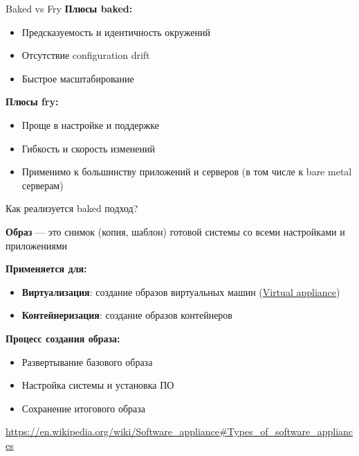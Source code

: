 \documentclass[aspectratio=169]{beamer}
\begin{document}
    \begin{frame}{Baked vs Fry}
        \textbf{Плюсы baked:}
        \vspace{0.2cm}
        \begin{itemize}
            \item Предсказуемость и идентичность окружений
            \item Отсутствие configuration drift
            \item Быстрое масштабирование
        \end{itemize}

        \vspace{0.3cm}
        \textbf{Плюсы fry:}
        \vspace{0.2cm}
        \begin{itemize}
            \item Проще в настройке и поддержке
            \item Гибкость и скорость изменений
            \item Применимо к большинству приложений и серверов (в том числе к bare metal серверам)
        \end{itemize}
    \end{frame}

    \begin{frame}{Как реализуется baked подход?}

        \textbf{Образ} — это снимок (копия, шаблон) готовой системы со всеми настройками и приложениями

        \textbf{Применяется для:}
        \begin{itemize}
        \item \textbf{Виртуализация}: создание образов виртуальных машин (\href{https://en.wikipedia.org/wiki/Virtual_appliance}{Virtual appliance})
        \item \textbf{Контейнеризация}: создание образов контейнеров
        \end{itemize}

        \textbf{Процесс создания образа:}
        \begin{itemize}
            \item Развертывание базового образа
            \item Настройка системы и установка ПО
            \item Сохранение итогового образа
        \end{itemize}

        \footnotesize{\textcolor{gray}{\url{https://en.wikipedia.org/wiki/Software_appliance\#Types_of_software_appliances}}}
    \end{frame}
\end{document}

